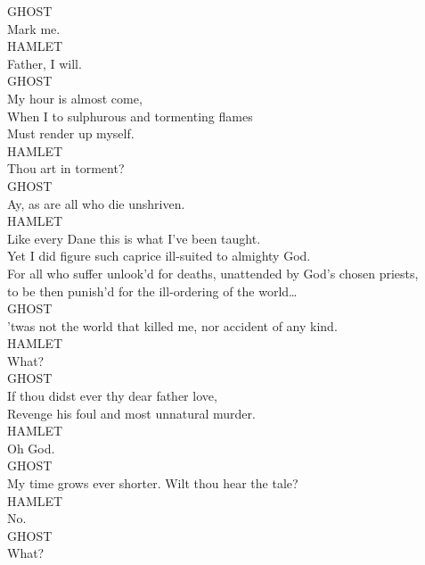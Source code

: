 \noindent{}GHOST\\
Mark me.\\

\noindent{}HAMLET\\
Father, I will.\\

\noindent{}GHOST\\
My hour is almost come,\\
When I to sulphurous and tormenting flames\\
Must render up myself.\\

\noindent{}HAMLET\\
Thou art in torment?\\

\noindent{}GHOST\\
Ay, as are all who die unshriven.\\

\noindent{}HAMLET\\
Like every Dane this is what I've been taught.\\
Yet I did figure such caprice ill-suited to almighty God.\\
For all who suffer unlook'd for deaths, unattended by God's chosen priests,\\
to be then punish'd for the ill-ordering of the world{\ldots}\\

\noindent{}GHOST\\
'twas not the world that killed me, nor accident of any kind.\\

\noindent{}HAMLET\\
What?\\

\noindent{}GHOST\\
If thou didst ever thy dear father love,\\
Revenge his foul and most unnatural murder.\\

\noindent{}HAMLET\\
Oh God.\\

\noindent{}GHOST\\
My time grows ever shorter. Wilt thou hear the tale?\\

\noindent{}HAMLET\\
No.\\

\noindent{}GHOST\\
What?\\

